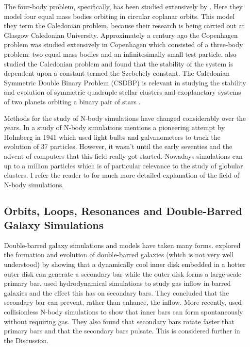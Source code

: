 \documentclass[a4paper,12pt]{article}
\begin{document}
The four-body problem, specifically, has been studied extensively by \cite{steves}. Here they model four equal mass bodies orbiting in circular coplanar orbits. This model they term the Caledonian problem, because
their research is being carried out at Glasgow Caledonian University.
Approximately a century ago the Copenhagen problem was studied extensively in Copenhagen which consisted of a three-body problem: two equal mass bodies and an infinitesimally small test particle. \cite{szell} also
studied the Caledonian problem and found that the stability of the system is dependent upon a constant termed the Szebehely constant. The Caledonian Symmetric Double Binary Problem (CSDBP) is relevant in 
studying the stability and evolution of symmetric quadruple stellar clusters and exoplanetary systems of two planets orbiting a binary pair of stars \citep{alvarez}.

Methods for the study of N-body simulations have changed considerably over the years. In a study of N-body simulations \cite{trenti} mentions a pioneering attempt by Holmberg in 1941 which used 
light bulbs and galvanometers to track the evolution of 37 particles. However, it wasn't until the early seventies and the advent of computers that this field really got started. 
Nowadays simulations can up to a million particles \citep{heggie} which is of particular relevance to the study of globular
clusters. I refer the reader to \cite{aarseth} for much more detailed explanation of the field of N-body simulations.

\subsection{Orbits, Loops, Resonances and Double-Barred Galaxy Simulations}
Double-barred galaxy simulations and models have taken many forms. \cite{du1} explored the formation and evolution of double-barred galaxies (which is not very well understood) by showing that a dynamically
cool inner disk embedded in a hotter outer disk can generate a secondary bar while the outer disk forms a large-scale primary bar. \cite{macie8} used hydrodynamical simulations to study gas inflow in barred galaxies
and the effect this has on secondary bars. They concluded that the secondary bar can prevent, rather than enhance, the inflow. More recently, \cite{debattista} used collisionless N-body simulations to show
that inner bars can form spontaneously without requiring gas. They also found that secondary bars rotate faster that primary bars and that the secondary bars pulsate. This is considered further in the Discussion.
\end{document}
